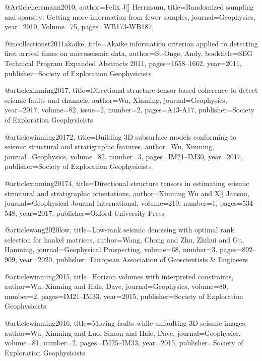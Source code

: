 @Article{herrmann2010,
  author={Felix J[] Herrmann},
  title={Randomized sampling and sparsity: Getting more information from fewer samples},
  journal={Geophysics},
  year=2010,
  Volume=75,
  pages={WB173-WB187},
}

@incollection{st2011akaike,
  title={Akaike information criterion applied to detecting first arrival times on microseismic data},
  author={St-Onge, Andy},
  booktitle={SEG Technical Program Expanded Abstracts 2011},
  pages={1658--1662},
  year={2011},
  publisher={Society of Exploration Geophysicists}
}

@article{xinming2017,
  title={Directional structure-tensor-based coherence to detect seismic faults and channels},
  author={Wu, Xinming},
  journal={Geophysics},
  year={2017},
  volume=82,
  issue=2,
  number=2,
  pages={A13-A17},
  publisher={Society of Exploration Geophysicists}
}

@article{winming20172,
  title={Building 3{D} subsurface models conforming to seismic structural and stratigraphic features},
  author={Wu, Xinming},
  journal={Geophysics},
  volume={82},
  number={3},
  pages={IM21--IM30},
  year={2017},
  publisher={Society of Exploration Geophysicists}
}

@article{xinming20174,
  title={Directional structure tensors in estimating seismic structural and stratigraphic orientations},
  author={Xinming Wu and X[] Janson},
  journal={Geophysical Journal International},
  volume={210},
  number={1},
  pages={534-548},
  year={2017},
  publisher={Oxford University Press}
}


@article{wang2020low,
  title={Low-rank seismic denoising with optimal rank selection for hankel matrices},
  author={Wang, Chong and Zhu, Zhihui and Gu, Hanming},
  journal={Geophysical Prospecting},
  volume={68},
  number={3},
  pages={892--909},
  year={2020},
  publisher={European Association of Geoscientists \& Engineers}
}


@article{winming2015,
  title={Horizon volumes with interpreted constraints},
  author={Wu, Xinming and Hale, Dave},
  journal={Geophysics},
  volume={80},
  number={2},
  pages={IM21--IM33},
  year={2015},
  publisher={Society of Exploration Geophysicists}
}

@article{winming2016,
  title={Moving faults while unfaulting 3D seismic images},
  author={Wu, Xinming and Luo, Simon and Hale, Dave},
  journal={Geophysics},
  volume={81},
  number={2},
  pages={IM25--IM33},
  year={2015},
  publisher={Society of Exploration Geophysicists}
}


